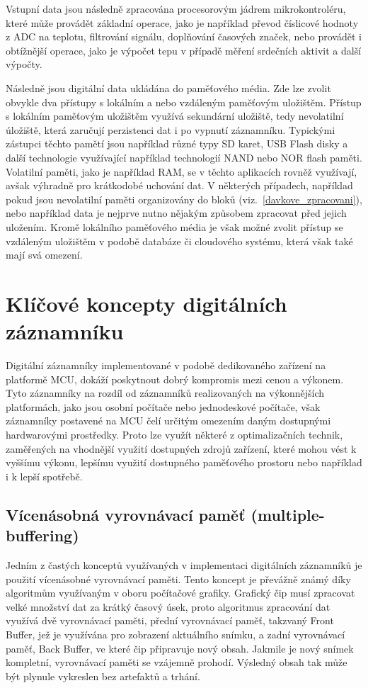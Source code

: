 \newpage

Vstupní data jsou následně zpracována procesorovým jádrem mikrokontroléru, které může provádět základní operace, jako je například převod číslicové hodnoty z ADC na teplotu, filtrování signálu, doplňování časových značek, nebo provádět i obtížnější operace, jako je výpočet tepu v případě měření srdečních aktivit a další výpočty.

Následně jsou digitální data ukládána do paměťového média. Zde lze zvolit obvykle dva přístupy s lokálním a nebo vzdáleným paměťovým uložištěm. Přístup s lokálním paměťovým uložištěm využívá sekundární uložiště, tedy nevolatilní úložiště, která zaručují perzistenci dat i po vypnutí záznamníku. Typickými zástupci těchto pamětí jsou například různé typy SD karet, USB Flash disky a další technologie využívající například technologií NAND nebo NOR flash paměti. Volatilní paměti, jako je například RAM, se v těchto aplikacích rovněž využívají, avšak výhradně pro krátkodobé uchování dat. V některých případech, například pokud jsou nevolatilní paměti organizovány do bloků (viz.~\ref{davkove_zpracovani}), nebo například data je nejprve nutno nějakým způsobem zpracovat před jejich uložením. Kromě lokálního paměťového média je však možné zvolit přístup se vzdáleným uložištěm v podobě databáze či cloudového systému, která však také mají svá omezení.


\section{Klíčové koncepty digitálních záznamníku} 
\label{klicove_koncepty_digitalnich_zaznamniku}
Digitální záznamníky implementované v podobě dedikovaného zařízení na platformě MCU, dokáží poskytnout dobrý kompromis mezi cenou a výkonem. Tyto záznamníky na rozdíl od záznamníků realizovaných na výkonnějších platformách, jako jsou osobní počítače nebo jednodeskové počítače, však záznamníky postavené na MCU čelí určitým omezením daným dostupnými hardwarovými prostředky. Proto lze využít některé z optimalizačních technik, zaměřených na vhodnější využití dostupných zdrojů zařízení, které mohou vést k vyššímu výkonu, lepšímu využití dostupného paměťového prostoru nebo například i k lepší spotřebě.

\subsection{Vícenásobná vyrovnávací paměť (multiple-buffering)}
\label{vicenasobna_vyrovnavaci_pamet}
Jedním z častých konceptů využívaných v implementaci digitálních záznamníků je použití vícenásobné vyrovnávací paměti. Tento koncept je převážně známý díky algoritmům využívaným v oboru počítačové grafiky. Grafický čip musí zpracovat velké množství dat za krátký časový úsek, proto algoritmus zpracování dat využívá dvě vyrovnávací paměti, přední vyrovnávací paměť, takzvaný Front Buffer, jež je využívána pro zobrazení aktuálního snímku, a zadní vyrovnávací paměť, Back Buffer, ve které čip připravuje nový obsah. Jakmile je nový snímek kompletní, vyrovnávací paměti se vzájemně prohodí. Výsledný obsah tak může být plynule vykreslen bez artefaktů a trhání. \cite{double_buffering_model}

